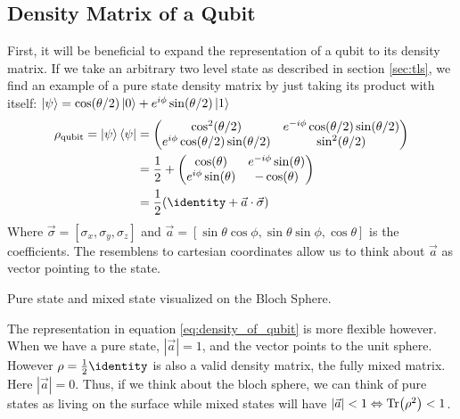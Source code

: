 \subsection{Density Matrix of a Qubit}
First, it will be beneficial to expand the representation of a qubit to its density matrix. If we take an arbitrary two level state as described in section \ref{sec:tls}, we find an example of a pure state density matrix by just taking its product with itself: $\ket{\psi} = \cos (\theta / 2) \ket{0} + e^{i\phi}\sin(\theta / 2)\ket{1}$
\begin{align}
    \rho_{\text{qubit}} = \ket{\psi}\bra{\psi} &= \begin{pmatrix}
        \cos^2(\theta/2)                        & e^{-i\phi}\cos(\theta/2)\sin(\theta/2) \\
        e^{i\phi}\cos(\theta/2)\sin(\theta/2)  & \sin^2(\theta/2)
    \end{pmatrix} \nonumber \\
    &= \frac12 + \begin{pmatrix}
        \cos(\theta)                       & e^{-i\phi}\sin(\theta) \\
        e^{i\phi}\sin(\theta)  & -\cos(\theta)   
    \end{pmatrix} \nonumber \\
    &= \frac12 (\identity + \Vec{a} \cdot \Vec{\sigma}) \label{eq:density_of_qubit}
\end{align}
Where $\Vec{\sigma} = [\sigma_x, \sigma_y, \sigma_z]$ and $\Vec{a} = [\sin{\theta}\cos{\phi}, \sin{\theta}\sin{\phi}, \cos{\theta}]$ is the coefficients. \cite{krantz_quantum_2019} The resemblens to cartesian coordinates allow us to think about $\Vec{a}$ as vector pointing to the state.

\begin{marginfigure}
    \centering
    \caption{Pure state and mixed state visualized on the Bloch Sphere. }
    \label{fig:bloch_sphere_density_matrix}
\end{marginfigure}

The representation in equation \ref{eq:density_of_qubit} is more flexible however. When we have a pure state, $|\Vec{a}| = 1$, and the vector points to the unit sphere. However $\rho = \frac12 \identity$ is also a valid density matrix, the fully mixed matrix. Here $|\Vec{a}|=0$. Thus, if we think about the bloch sphere, we can think of pure states as living on the surface while mixed states will have $|\Vec{a}|<1\Leftrightarrow \Tr(\rho^2) < 1$.

